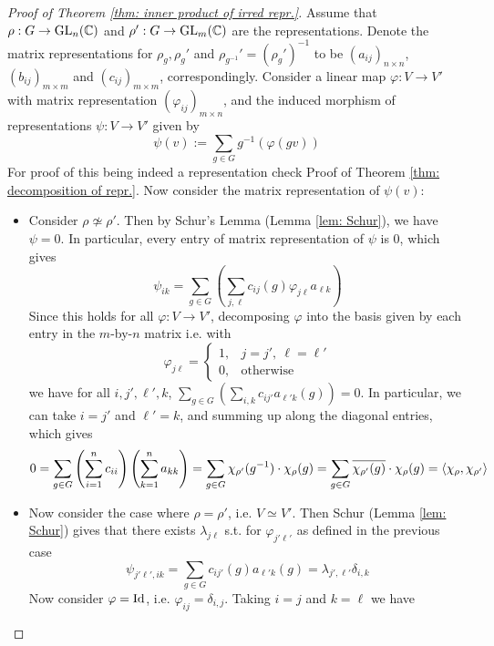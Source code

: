 \documentclass{article}
\begin{document}
\begin{proof}[Proof of Theorem \ref{thm: inner product of irred repr.}]
    Assume that $\rho: G \to \mathrm{GL}_n(\mathbb{C})$ and $\rho': G \to \mathrm{GL}_m(\mathbb{C})$ are the representations. Denote the matrix representations for $\rho_g, \rho_{g}'$ and $\rho_{g^{-1}}' = (\rho_{g}')^{-1}$ to be $(a_{ij})_{n \times n}$, $(b_{ij})_{m \times m}$ and $(c_{ij})_{m \times m}$, correspondingly. Consider a linear map $\varphi: V \to V'$ with matrix representation $(\varphi_{ij})_{m \times n}$, and the induced morphism of representations $\psi: V \to V'$ given by
    \[
        \psi(v) := \sum_{g \in G} g^{-1}(\varphi(gv))
    \]
    For proof of this being indeed a representation check Proof of Theorem \ref{thm: decomposition of repr.}. Now consider the matrix representation of $\psi(v)$:
    \begin{itemize}
        \item Consider $\rho \nsimeq \rho'$. Then by Schur's Lemma (Lemma \ref{lem: Schur}), we have $\psi = 0$. In particular, every entry of matrix representation of $\psi$ is 0, which gives
        \[
            \psi_{ik} = \sum_{g \in G} \left( \sum_{j, \ell} c_{ij}(g) \varphi_{j \ell} a_{\ell k} \right)
        \]
        Since this holds for all $\varphi: V \to V'$, decomposing $\varphi$ into the basis given by each entry in the $m$-by-$n$ matrix i.e. with
        \[
            \varphi_{j\ell} = 
            \begin{cases}
                1, & j = j',\ \ell = \ell' \\
                0, & \text{otherwise}
            \end{cases}
        \]
        we have for all $i, j', \ell', k$, $\sum_{g \in G} (\sum_{i, k} c_{i j'} a_{\ell' k}(g)) = 0$. In particular, we can take $i = j'$ and $\ell' = k$, and summing up along the diagonal entries, which gives
        \[
            0 = \sum_{g \in G} \left( \sum_{i = 1}^n c_{ii} \right) \left( \sum_{k = 1}^n a_{kk} \right)
            = \sum_{g \in G} \chi_{\rho'}(g^{-1}) \cdot \chi_{\rho} (g) = \sum_{g \in G} \overline{\chi_{\rho'}(g)} \cdot \chi_{\rho} (g) = \left\langle \chi_{\rho}, \chi_{\rho'} \right\rangle
        \]
        \item Now consider the case where $\rho = \rho'$, i.e. $V \simeq V'$. Then Schur (Lemma \ref{lem: Schur}) gives that there exists $\lambda_{j \ell}$ s.t. for $\varphi_{j'\ell'}$ as defined in the previous case
        \[
            \psi_{j'\ell', ik} = \sum_{g \in G} c_{ij'}(g) a_{\ell' k}(g) = \lambda_{j', \ell'} \delta_{i, k}
        \]
        Now consider $\varphi = \mathrm{Id}$, i.e. $\varphi_{ij} = \delta_{i, j}$. Taking $i = j$ and $k = \ell$ we have

\end{itemize}
\end{proof}
\end{document}
